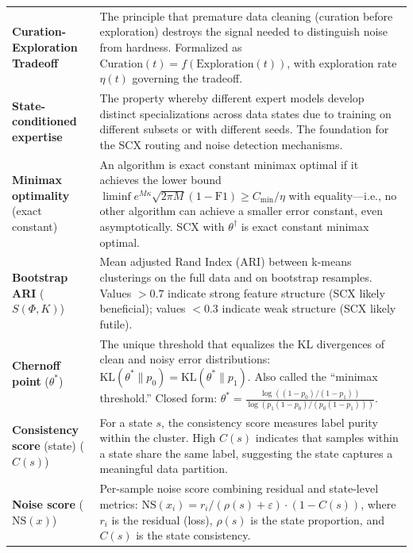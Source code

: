 \documentclass{article}
\begin{document}
\begin{longtable}{p{} p{}}
\textbf{Curation-Exploration Tradeoff} & The principle that premature data cleaning (curation before exploration) destroys the signal needed to distinguish noise from hardness. Formalized as $\text{Curation}(t) = f(\text{Exploration}(t))$, with exploration rate $\eta(t)$ governing the tradeoff. \\

\textbf{State-conditioned expertise} & The property whereby different expert models develop distinct specializations across data states due to training on different subsets or with different seeds. The foundation for the SCX routing and noise detection mechanisms. \\

\textbf{Minimax optimality} (exact constant) & An algorithm is exact constant minimax optimal if it achieves the lower bound $\liminf e^{M\kappa}\sqrt{2\pi M}(1-\text{F1}) \geq C_{\min}/\eta$ with equality---i.e., no other algorithm can achieve a smaller error constant, even asymptotically. SCX with $\theta^\dagger$ is exact constant minimax optimal. \\

\textbf{Bootstrap ARI} ($S(\Phi, K)$) & Mean adjusted Rand Index (ARI) between k-means clusterings on the full data and on bootstrap resamples. Values $>0.7$ indicate strong feature structure (SCX likely beneficial); values $<0.3$ indicate weak structure (SCX likely futile). \\

\textbf{Chernoff point} ($\theta^*$) & The unique threshold that equalizes the KL divergences of clean and noisy error distributions: $\text{KL}(\theta^*\|p_0) = \text{KL}(\theta^*\|p_1)$. Also called the ``minimax threshold.'' Closed form: $\theta^* = \frac{\log((1-p_0)/(1-p_1))}{\log(p_1(1-p_0)/(p_0(1-p_1)))}$. \\

\textbf{Consistency score} (state) ($C(s)$) & For a state $s$, the consistency score measures label purity within the cluster. High $C(s)$ indicates that samples within a state share the same label, suggesting the state captures a meaningful data partition. \\

\textbf{Noise score} ($\text{NS}(x)$) & Per-sample noise score combining residual and state-level metrics: $\text{NS}(x_i) = r_i / (\rho(s) + \varepsilon) \cdot (1 - C(s))$, where $r_i$ is the residual (loss), $\rho(s)$ is the state proportion, and $C(s)$ is the state consistency. \\


\end{longtable}
\end{document}

